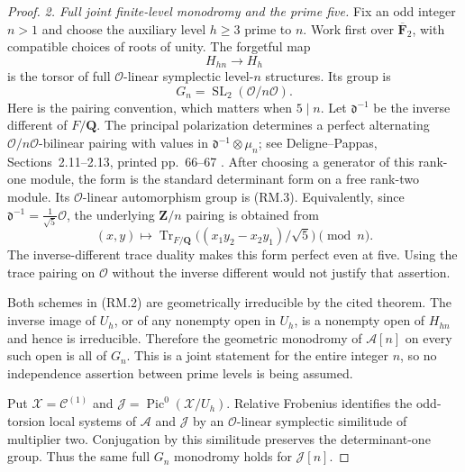 \documentclass[11pt,a4paper]{article}
\begin{document}
\begin{proof}
\emph{2. Full joint finite-level monodromy and the prime five.}
Fix an odd integer $n>1$ and choose the auxiliary level $h\geq3$
prime to $n$.  Work first over $\overline{\mathbf F}_2$, with compatible
choices of roots of unity.  The forgetful map
\[
                      H_{hn}\longrightarrow H_h             \tag{RM.2}
\]
is the torsor of full $\mathcal O$-linear symplectic level-$n$
structures.  Its group is
\[
                         G_n=\operatorname{SL}_2(\mathcal O/n\mathcal O).
                                                               \tag{RM.3}
\]
Here is the pairing convention, which matters when $5\mid n$.
Let $\mathfrak d^{-1}$ be the inverse different of $F/\mathbf Q$.
The principal polarization determines a perfect alternating
$\mathcal O/n\mathcal O$-bilinear pairing with values in
$\mathfrak d^{-1}\otimes\mu_n$; see Deligne--Pappas,
Sections~2.11--2.13, printed pp.~66--67
\cite{DelignePappas1994}.  After choosing a generator of this
rank-one module, the form is the standard determinant form on a
free rank-two module.  Its $\mathcal O$-linear automorphism group
is (RM.3).  Equivalently, since
$\mathfrak d^{-1}=\frac1{\sqrt5}\mathcal O$, the underlying
$\mathbf Z/n$ pairing is obtained from
\[
 (x,y)\longmapsto
   \operatorname{Tr}_{F/\mathbf Q}
       \bigl((x_1y_2-x_2y_1)/\sqrt5\bigr)\pmod n.             \tag{RM.4}
\]
The inverse-different trace duality makes this form perfect even
at five.  Using the trace pairing on $\mathcal O$ without the
inverse different would not justify that assertion.

Both schemes in (RM.2) are geometrically irreducible by the cited
theorem.  The inverse image of $U_h$, or of any nonempty open in
$U_h$, is a nonempty open of $H_{hn}$ and hence is irreducible.
Therefore the geometric monodromy of $\mathcal A[n]$ on every
such open is all of $G_n$.  This is a joint statement for the
entire integer $n$, so no independence assertion between prime
levels is being assumed.

Put $\mathcal X=\mathcal C^{(1)}$ and
$\mathcal J=\operatorname{Pic}^0(\mathcal X/U_h)$.
Relative Frobenius identifies the odd-torsion local systems of
$\mathcal A$ and $\mathcal J$ by an $\mathcal O$-linear
symplectic similitude of multiplier two.  Conjugation by this
similitude preserves the determinant-one group.  Thus the same
full $G_n$ monodromy holds for $\mathcal J[n]$.


\end{proof}
\end{document}
